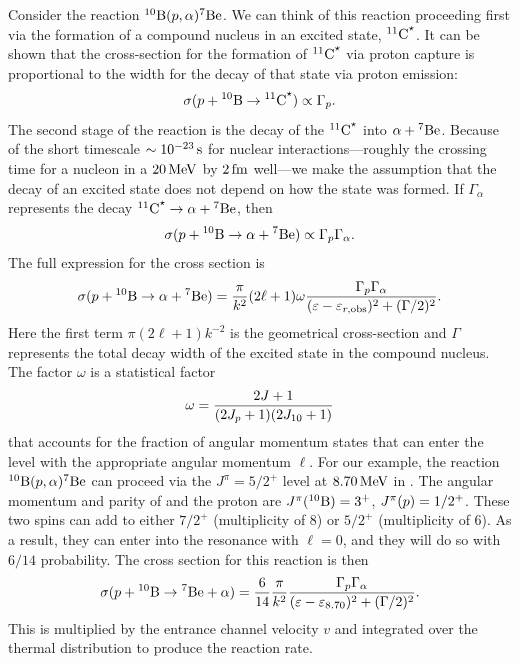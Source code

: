 Consider the reaction $\boron[10](\pt,\alpha)\beryllium[7]$. We can think of this reaction proceeding first via the formation of a compound nucleus in an excited state, $\carbon[11]^{\star}$. It can be shown that the cross-section for the formation of $\carbon[11]^{\star}$ via proton capture is proportional to the width for the decay of that state via proton emission: 
\begin{equation}\label{e.reciprocity}
\sigma(\pt + \boron[10]\to \carbon[11]^{\star}) \propto \Gamma_{\pt}.
\end{equation}
The second stage of the reaction is the decay of the $\carbon[11]^{\star}$ into $\alpha + \beryllium[7]$.
Because of the short timescale $\sim 10^{-23}\nsp\second$ for nuclear interactions---roughly the crossing time for a nucleon in a $20\nsp\MeV$ by $2\nsp\fermi$ well---we make the assumption that the decay of an excited state does not depend on how the state was formed. If $\Gamma_{\alpha}$ represents the decay $\carbon[11]^{\star}\to \alpha+\beryllium[7]$, then
\[ \sigma(\pt + \boron[10] \to \alpha+\beryllium[7]) \propto \Gamma_{\pt}\Gamma_{\alpha}. \]
The full expression for the cross section is
\begin{equation}\label{e.resonant-cross-section}
 \sigma(\pt + \boron[10] \to \alpha+\beryllium[7])  = \frac{\pi}{k^{2}}(2\ell + 1)\omega\frac{\Gamma_{\pt}\Gamma_{\alpha}}{(\varepsilon - \varepsilon_{r,\mathrm{obs}})^{2} + (\Gamma/2)^{2}}.
\end{equation}
Here the first term $\pi(2\ell+1)k^{-2}$ is the geometrical cross-section and $\Gamma$ represents the total decay width of the excited state in the compound nucleus.  The factor $\omega$  is a statistical factor
\begin{equation}\label{e.stat-factor}
\omega = \frac{2J + 1}{(2J_{\pt}+1)(2J_{10}+1)}
\end{equation}
that accounts for the fraction of angular momentum states that can enter the level with the appropriate angular momentum $\ell$.
For our example, the reaction $\boron[10](\pt,\alpha)\beryllium[7]$ can proceed via  the $J^{\pi} = 5/2^{+}$ level at $8.70\nsp\MeV$ in \carbon[11].  The angular momentum and parity of \boron[10] and the proton are $J^{\pi}(\boron[10]) = 3^{+}$, $J^{\pi}(\pt) = 1/2^{+}$.  These two spins can add to either $7/2^{+}$ (multiplicity of 8) or $5/2^{+}$ (multiplicity of 6).  As a result, they can enter into the resonance with $\ell = 0$, and they will do so with $6/14$ probability.  The cross section for this reaction is then
\[
\sigma(\pt + \boron[10]\to\beryllium[7]+\alpha) = \frac{6}{14}\frac{\pi}{k^{2}}\frac{\Gamma_{\pt}\Gamma_{\alpha}}{(\varepsilon-\varepsilon_{8.70})^{2} + (\Gamma/2)^{2}}.
\]
This is multiplied by the entrance channel velocity $v$ and integrated over the thermal distribution to produce the reaction rate.

